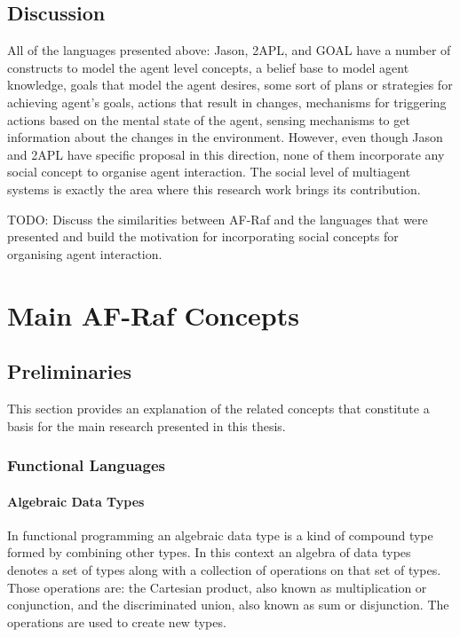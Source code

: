 \documentclass[a4paper,12pt,oneside,fleqn]{book} %
\begin{document}
\section{Discussion} %

All of the languages presented above: Jason, 2APL, and GOAL have a number
of constructs to model the agent level concepts, a belief base to model
agent knowledge, goals that model the agent desires, some sort of plans or
strategies for achieving agent's goals, actions that result in changes,
mechanisms for triggering actions based on the mental state of the agent,
sensing mechanisms to get information about the changes in the environment.
However, even though Jason and 2APL have specific proposal in this
direction, none of them incorporate any social concept to organise agent
interaction. The social level of multiagent systems is exactly the area
where this research work brings its contribution.

TODO: Discuss the similarities between AF-Raf and the languages that were
presented and build the motivation for incorporating social concepts for
organising agent interaction.


\chapter{Main AF-Raf Concepts}\label{ch:concepts} %

\section{Preliminaries} %

This section provides an explanation of the related concepts that
constitute a basis for the main research presented in this thesis.

\subsection{Functional Languages} %

\subsubsection{Algebraic Data Types}

In functional programming an algebraic data type is a kind of compound type
formed by combining other types. In this context an algebra of data types
denotes a set of types along with a collection of operations on that set of
types. Those operations are: the Cartesian product, also known as
multiplication or conjunction, and the discriminated union, also known as
sum or disjunction. The operations are used to create new types.
\end{document}
